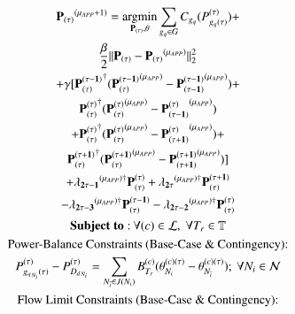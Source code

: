 \documentclass[preprint,12pt,3p]{elsarticle}
\begin{document}
\begin{subequations}\label{Look-Ahead_General_Second_Interval_Angle}
\begin{gather}
\mathbf{P_{(\tau)}}^{(\mu_{APP}+1)}=\argmin_{\mathbf{P_{(\tau)}},\theta} \sum_{{g_q}\in G}C_{g_q}(P_{{g_q}(\tau)}^{(\tau)})+\notag\\\frac{\beta}{2}||\mathbf{P_{(\tau)}}-\mathbf{P_{(\tau)}}^{(\mu_{APP})}||_2^2\notag\\+\gamma[\mathbf{P_{(\tau)}^{(\tau-1)}}^{\dagger}(\mathbf{P_{(\tau)}^{(\tau-1)}}^{(\mu_{APP})}-\mathbf{P_{(\tau-1)}^{(\tau-1)}}^{(\mu_{APP})})+\notag\\\mathbf{P_{(\tau)}^{(\tau)}}^{\dagger}(\mathbf{P_{(\tau)}^{(\tau)}}^{(\mu_{APP})}-\mathbf{P_{(\tau-1)}^{(\tau)}}^{(\mu_{APP})})\notag\\+\mathbf{P_{(\tau)}^{(\tau)}}^{\dagger}(\mathbf{P_{(\tau)}^{(\tau)}}^{(\mu_{APP})}-\mathbf{P_{(\tau+1)}^{(\tau)}}^{(\mu_{APP})})+\notag\\\mathbf{P_{(\tau)}^{(\tau+1)}}^{\dagger}(\mathbf{P_{(\tau)}^{(\tau+1)}}^{(\mu_{APP})}-\mathbf{P_{(\tau+1)}^{(\tau+1)}}^{(\mu_{APP})})]\notag\\+ \mathbf{\lambda_{2\tau-1}}^{(\mu_{APP})\dagger}\mathbf{P_{(\tau)}^{(\tau)}}+\mathbf{\lambda_{2\tau}}^{(\mu_{APP})\dagger}\mathbf{P_{(\tau)}^{(\tau+1)}}\notag\\-\mathbf{\lambda_{2\tau-3}}^{(\mu_{APP})\dagger}\mathbf{P_{(\tau)}^{(\tau-1)}}-\mathbf{\lambda_{2\tau-2}}^{(\mu_{APP})\dagger}\mathbf{P_{(\tau)}^{(\tau)}}\label{first_Look-Ahead_General_Second_Interval_Angle}\\
\mathbf{Subject\;to:}\:\forall(c)\in\mathcal{L},\;\forall T_r\in \mathbb{T}\notag\\
\text{Power-Balance Constraints (Base-Case \& Contingency):}\notag\\
P_{{g_q}_{N_i}(\tau)}^{(\tau)}-P_{{D_d}_{N_i}}^{(\tau)}=\sum_{N_{\overline{i}}\in{J(N_i)}}B_{T_r}^{(c)}(\theta_{N_i}^{(c)(\tau)}-\theta_{N_{\overline{i}}}^{(c)(\tau)});\ \forall{{N_i}\in\mathcal{N}}\label{secondA_Look-Ahead_General_Second_Interval_Angle}\\
\text{Flow Limit Constraints (Base-Case \& Contingency):}\notag\\

\end{gather}
\end{subequations}
\end{document}
